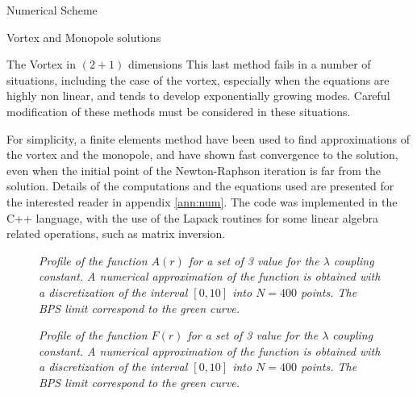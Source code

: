 \begin{section}{Numerical Scheme}
\begin{subsection}{Vortex and Monopole solutions}
\begin{subsubsection}{The Vortex in $(2+1)$ dimensions}
      This last method fails in a number of situations, including the
      case of the vortex, especially when the equations are highly non
      linear, and tends to develop exponentially growing
      modes. Careful modification of these methods must be considered
      in these situations.

      For simplicity, a finite elements method have been used to find
      approximations of the vortex and the monopole, and have shown
      fast convergence to the solution, even when the initial point of
      the Newton-Raphson iteration is far from the solution. Details
      of the computations and the equations used are presented for the
      interested reader in appendix \ref{ann:num}.  The code was
      implemented in the C++ language, with the use of the Lapack
      routines for some linear algebra related operations, such as
      matrix inversion.

      \begin{figure}[!ht]
        \begin{center}
          
          \caption{\em Profile of the function $A(r)$ for a set of 3
            value for the $\lambda$ coupling constant. A numerical
            approximation of the function is obtained with a
            discretization of the interval $[0,10]$ into $N = 400$
            points. The BPS limit correspond to the green curve.}
          \label{fig:2d_vortex_a}
        \end{center}
      \end{figure}

      \begin{figure}[!ht]
        \begin{center}
          
          \caption{\em Profile of the function $F(r)$ for a set of 3
            value for the $\lambda$ coupling constant. A numerical
            approximation of the function is obtained with a
            discretization of the interval $[0,10]$ into $N = 400$
            points. The BPS limit correspond to the green curve.}
          \label{fig:2d_vortex_f}
        \end{center}
      \end{figure}


\end{subsubsection}
\end{subsection}
\end{section}
